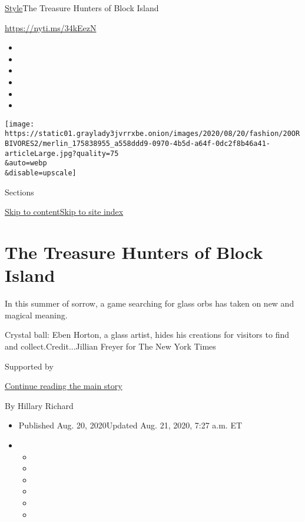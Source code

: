 \href{/section/style}{Style}\textbar{}The Treasure Hunters of Block
Island

\url{https://nyti.ms/34kEezN}

\begin{itemize}
\item
\item
\item
\item
\item
\item
\end{itemize}

\texttt{[image: https://static01.graylady3jvrrxbe.onion/images/2020/08/20/fashion/20ORBIVORES2/merlin\_175838955\_a558ddd9-0970-4b5d-a64f-0dc2f8b46a41-articleLarge.jpg?quality=75\\\&auto=webp\\\&disable=upscale]}

Sections

\protect\hyperlink{site-content}{Skip to
content}\protect\hyperlink{site-index}{Skip to site index}

\hypertarget{the-treasure-hunters-of-block-island}{%
\section{The Treasure Hunters of Block
Island}\label{the-treasure-hunters-of-block-island}}

In this summer of sorrow, a game searching for glass orbs has taken on
new and magical meaning.

Crystal ball: Eben Horton, a glass artist, hides his creations for
visitors to find and collect.Credit...Jillian Freyer for The New York
Times

Supported by

\protect\hyperlink{after-sponsor}{Continue reading the main story}

By Hillary Richard

\begin{itemize}
\item
  Published Aug. 20, 2020Updated Aug. 21, 2020, 7:27 a.m. ET
\item
  \begin{itemize}
  \item
  \item
  \item
  \item
  \item
  \item
  \end{itemize}
\end{itemize}


